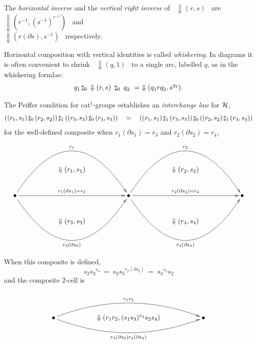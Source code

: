 The \emph{horizontal inverse} and the 
\emph{vertical right inverse} of ~$\Downarrow(r,s)$~ 
are ~$\Downarrow(r^{-1},(s^{-1})^{r^{-1}})$~ and \\  
$\Downarrow(r(\partial s),s^{-1})$~ respectively.

Horizontal composition with vertical identities is called 
\emph{whiskering}. 
In diagrams it is often convenient to shrink ~$\Downarrow(q,1)$~ 
to a single arc, labelled $q$, as in the whiskering formlae:
$$
q_1 \,\sharp_0\, \Downarrow(r,s) ~\,\sharp_0\,~ q_2 
~=~ \Downarrow(q_1rq_2,{s}^{q_2}).
$$

\bigskip\noindent
The Peiffer condition for cat$^1$-groups establishes an 
  
\emph{interchange law} for $\mathcal{H}$,
$$
((r_1,s_1) \,\sharp_0\, (r_2,s_2)) \,\sharp_1\, ((r_3,s_3) \,\sharp_0\, (r_4,s_4))
\quad = \quad
((r_1,s_1) \,\sharp_1\, (r_3,s_3)) \,\sharp_0\, ((r_2,s_2) \,\sharp_1\, (r_4,s_4)) 
$$
for the well-defined composite 
when $r_1(\partial s_1) = r_3$ and $r_2(\partial s_2) = r_4$,
$$
\xy
\xymatrix{
  && && && && \\
  && \Downarrow (r_1,s_1)
     && && \Downarrow (r_2,s_2)
           && \\
  \bullet \ar@/^15ex/[rrrr]^{r_1} 
          \ar[rrrr]^{r_1(\partial s_1) = r_3}
          \ar@/_15ex/[rrrr]_{r_3(\partial s_3)} 
  && && \bullet \ar@/^15ex/[rrrr]^{r_2} 
                \ar[rrrr]^{r_2(\partial s_2) = r_4}
                \ar@/_15ex/[rrrr]_{r_4(\partial s_4)} 
        && && \bullet \\
  && \Downarrow (r_3,s_3)
     && && \Downarrow (r_4,s_4)
           && \\
  && && && && \\
}
\endxy
$$

\noindent
When this composite is defined, 
$$
    s_2{s_3}^{r_4}
~=~ s_2{s_3}^{r_2(\partial s_2)}
~=~ {s_3}^{r_2}s_2
$$
and the composite $2$-cell is
$$
\xy
\xymatrix{
   && && \\
   \bullet \ar@/^5ex/[rrrr]^{r_1r_2} 
           \ar@/_5ex/[rrrr]_{r_3(\partial s_3)r_4(\partial s_4)} 
   && \Downarrow (r_1r_2,(s_1s_3)^{r_2}s_2s_4)
      && \bullet \\
   && && \\
}
\endxy
$$

